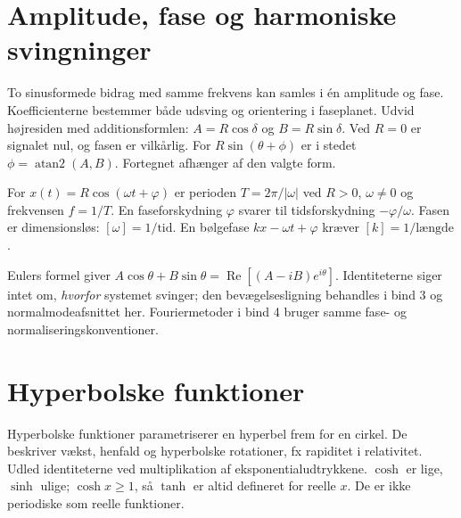 \section{Amplitude, fase og harmoniske svingninger}
To sinusformede bidrag med samme frekvens kan samles i én amplitude og
fase. Koefficienterne bestemmer både udsving og orientering i faseplanet.
Udvid højresiden med additionsformlen: $A=R\cos\delta$ og
$B=R\sin\delta$. Ved $R=0$ er signalet nul, og fasen er vilkårlig.
For $R\sin(\theta+\phi)$ er i stedet
$\phi=\operatorname{atan2}(A,B)$. Fortegnet afhænger af den valgte form.



For $x(t)=R\cos(\omega t+\varphi)$ er perioden
$T=2\pi/|\omega|$ ved $R>0$, $\omega\ne0$ og frekvensen $f=1/T$.
En faseforskydning $\varphi$ svarer til tidsforskydning
$-\varphi/\omega$. Fasen er dimensionsløs: $[\omega]=1/\text{tid}$.
En bølgefase $kx-\omega t+\varphi$ kræver $[k]=1/\text{længde}$.

Eulers formel giver
$A\cos\theta+B\sin\theta=\operatorname{Re}[(A-iB)e^{i\theta}]$.
Identiteterne siger intet om, \emph{hvorfor} systemet svinger; den
bevægelsesligning behandles i bind 3 og normalmodeafsnittet her.
Fouriermetoder i bind 4 bruger samme fase- og normaliseringskonventioner.

\section{Hyperbolske funktioner}
Hyperbolske funktioner parametriserer en hyperbel frem for en cirkel.
De beskriver vækst, henfald og hyperbolske rotationer, fx rapiditet i relativitet.
Udled identiteterne ved multiplikation af eksponentialudtrykkene.
$\cosh$ er lige, $\sinh$ ulige; $\cosh x\ge1$, så $\tanh$ er altid
defineret for reelle $x$. De er ikke periodiske som reelle funktioner.

